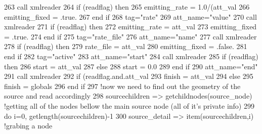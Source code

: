 \begin{DoxyCode}
263         \textcolor{keyword}{call }xmlreader%
264         \textcolor{keywordflow}{if} (readflag) \textcolor{keywordflow}{then}
265             emitting\_rate = 1.0/(att\_val%
266             emitting\_fixed = .true.
267 \textcolor{keywordflow}{        end if}
268         tag=\textcolor{stringliteral}{"rate"}
269         att\_name=\textcolor{stringliteral}{"value"}
270         \textcolor{keyword}{call }xmlreader%
271         \textcolor{keywordflow}{if} (readflag) \textcolor{keywordflow}{then}
272             emitting\_rate = att\_val%
273             emitting\_fixed = .true.
274 \textcolor{keywordflow}{        end if}
275         tag=\textcolor{stringliteral}{"rate\_file"}
276         att\_name=\textcolor{stringliteral}{"name"}
277         \textcolor{keyword}{call }xmlreader%
278         \textcolor{keywordflow}{if} (readflag) \textcolor{keywordflow}{then}
279             rate\_file = att\_val
280             emitting\_fixed = .false.
281 \textcolor{keywordflow}{        end if}
282         tag=\textcolor{stringliteral}{"active"}
283         att\_name=\textcolor{stringliteral}{"start"}
284         \textcolor{keyword}{call }xmlreader%
285         \textcolor{keywordflow}{if} (readflag) \textcolor{keywordflow}{then}
286             start = att\_val%
287         \textcolor{keywordflow}{else}
288             start = 0.0
289 \textcolor{keywordflow}{        end if}
290         att\_name=\textcolor{stringliteral}{"end"}
291         \textcolor{keyword}{call }xmlreader%
292         \textcolor{keywordflow}{if} (readflag.and.att\_val%
293             finish = att\_val%
294         \textcolor{keywordflow}{else}
295             finish = globals%
296 \textcolor{keywordflow}{        end if}
297         \textcolor{comment}{!now we need to find out the geometry of the source and read accordingly}
298         sourcechildren => getchildnodes(source\_node) \textcolor{comment}{!getting all of the nodes bellow the main source node
       (all of it's private info)}
299         \textcolor{keywordflow}{do} i=0, getlength(sourcechildren)-1
300             source\_detail => item(sourcechildren,i) \textcolor{comment}{!grabing a node}

\end{DoxyCode}

